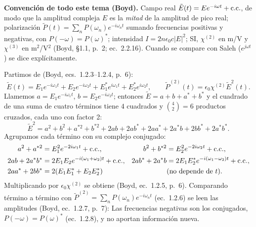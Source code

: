 
\noindent\textbf{Convención de todo este tema (Boyd).} Campo real $\tilde E(t)=Ee^{-i\omega t}+\text{c.c.}$, de modo que la amplitud compleja $E$ es la \emph{mitad} de la amplitud de pico real; polarización $\tilde P(t)=\sum_nP(\omega_n)e^{-i\omega_nt}$ sumando frecuencias positivas y negativas, con $P(-\omega)=P(\omega)^*$; intensidad $I=2n\epsilon_0c|E|^2$; SI, $\chi^{(2)}$ en m/V y $\chi^{(3)}$ en m$^2$/V$^2$ (Boyd, §1.1, p.~2; ec.~2.2.16). Cuando se compare con Saleh ($e^{j\omega t}$) se dice explícitamente.

\label{sol:28}

 Partimos de (Boyd, ecs.~1.2.3--1.2.4, p.~6):
\[
\tilde E(t)=E_1e^{-i\omega_1t}+E_2e^{-i\omega_2t}+E_1^*e^{i\omega_1t}+E_2^*e^{i\omega_2t},\qquad \tilde P^{(2)}(t)=\epsilon_0\chi^{(2)}\tilde E^2(t).
\]
Llamemos $a=E_1e^{-i\omega_1t}$, $b=E_2e^{-i\omega_2t}$; entonces $\tilde E=a+b+a^*+b^*$ y el cuadrado de una suma de cuatro términos tiene $4$ cuadrados y $\binom42=6$ productos cruzados, cada uno con factor 2:
\[
\tilde E^2=a^2+b^2+a^{*2}+b^{*2}+2ab+2ab^*+2aa^*+2a^*b+2bb^*+2a^*b^*.
\]
Agrupamos cada término con su complejo conjugado:
\begin{align*}
a^2+a^{*2}&=E_1^2e^{-2i\omega_1t}+\text{c.c.}, & b^2+b^{*2}&=E_2^2e^{-2i\omega_2t}+\text{c.c.},\\
2ab+2a^*b^*&=2E_1E_2e^{-i(\omega_1+\omega_2)t}+\text{c.c.}, & 2ab^*+2a^*b&=2E_1E_2^*e^{-i(\omega_1-\omega_2)t}+\text{c.c.},\\
2aa^*+2bb^*&=2(E_1E_1^*+E_2E_2^*) &&\text{(no depende de $t$).}
\end{align*}
Multiplicando por $\epsilon_0\chi^{(2)}$ se obtiene (Boyd, ec.~1.2.5, p.~6). Comparando término a término con $\tilde P^{(2)}=\sum_nP(\omega_n)e^{-i\omega_nt}$ (ec.~1.2.6) se leen las amplitudes (Boyd, ec.~1.2.7, p.~7):
Las frecuencias negativas son los conjugados, $P(-\omega)=P(\omega)^*$ (ec.~1.2.8), y no aportan información nueva.

